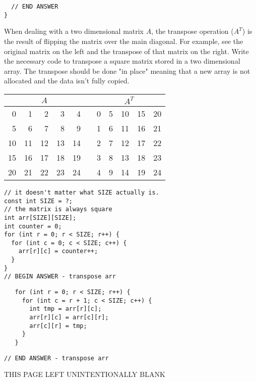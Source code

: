 \documentclass[11pt,answers]{exam}
\begin{document}
\begin{questions}
\begin{verbatim}
  // END ANSWER
}
\end{verbatim}

\newpage
\question[20] When dealing with a two dimensional matrix $A$, the transpose operation ($A^T$) is the result of flipping the matrix over the main diagonal. For example, see the original matrix on the left and the transpose of that matrix on the right. Write the necessary code to transpose a square matrix stored in a two dimensional array. The transpose should be done "in place" meaning that a new array is not allocated and the data isn't fully copied.\newline
\begin{center}
\begin{tabular}{|rrrrr|c|rrrrr|}
  \hline
  \multicolumn{5}{|c|}{$A$} & & \multicolumn{5}{|c|}{$A^T$} \\
  \hline
   0 &  1 &  2 &  3 &  4 &  & 0 &  5 & 10 & 15 & 20 \\
   5 &  6 &  7 &  8 &  9 &  & 1 &  6 & 11 & 16 & 21 \\
  10 & 11 & 12 & 13 & 14 &  & 2 &  7 & 12 & 17 & 22 \\ 
  15 & 16 & 17 & 18 & 19 &  & 3 &  8 & 13 & 18 & 23 \\
  20 & 21 & 22 & 23 & 24 &  & 4 &  9 & 14 & 19 & 24 \\
  \hline
\end{tabular}
\end{center}

\begin{verbatim}
// it doesn't matter what SIZE actually is.
const int SIZE = ?; 
// the matrix is always square
int arr[SIZE][SIZE];
int counter = 0;
for (int r = 0; r < SIZE; r++) {
  for (int c = 0; c < SIZE; c++) {
    arr[r][c] = counter++;
  }
}  
// BEGIN ANSWER - transpose arr
\end{verbatim}

\begin{solution}[3.75in]
 \begin{verbatim}
   for (int r = 0; r < SIZE; r++) {
     for (int c = r + 1; c < SIZE; c++) {
       int tmp = arr[r][c];
       arr[r][c] = arr[c][r];
       arr[c][r] = tmp;
     }
   }
 \end{verbatim}
\end{solution}

\begin{verbatim}
// END ANSWER - transpose arr  
\end{verbatim}

\newpage
\begin{center}{\large THIS PAGE LEFT UNINTENTIONALLY BLANK}\end{center}

\end{questions}
\end{document}
